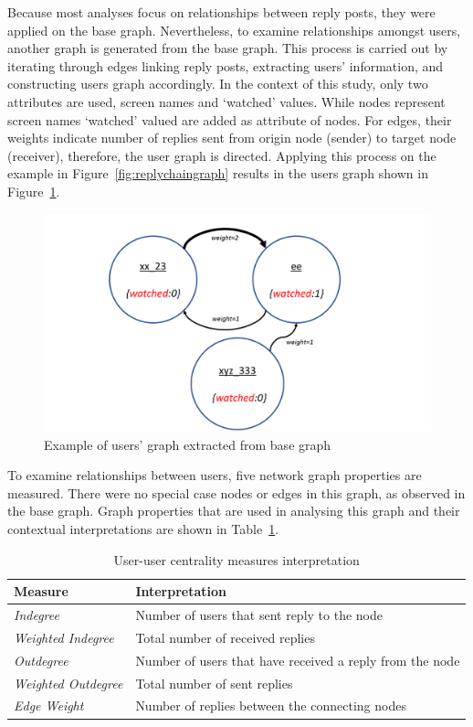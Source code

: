 \documentclass[sigconf]{acmart}
\begin{document}
Because most analyses focus on relationships between reply posts, they
were applied on the base graph. Nevertheless, to examine relationships
amongst users, another graph is generated from the base graph. This
process is carried out by iterating through edges linking reply posts,
extracting users' information, and constructing users graph
accordingly. In the context of this study, only two attributes are used, 
screen names and `watched' values. While nodes represent screen names 
`watched' valued are added as attribute of nodes. For edges, their weights 
indicate number of replies sent from origin node (sender) to target
node (receiver), therefore, the user graph is directed. Applying this
process on the example in Figure~\ref{fig:replychaingraph} results in
the users graph shown in Figure~\ref{fig:usersgraph}.

\begin{figure}[htb]
\centering
\includegraphics[width=\columnwidth]{images/usersgraph.png}
\caption{Example of users' graph extracted from base graph}
\label{fig:usersgraph}
\end{figure}

To examine relationships between users, five network graph properties
are measured. There were no special case nodes or edges in this graph,
as observed in the base graph. Graph properties that are used in
analysing this graph and their contextual interpretations are shown in
Table~\ref{tbl:uucentralitymeasuresinter}.

\begin{table}[!h]
\centering
\begin{tabularx}{\columnwidth}{lX}
\toprule
\textbf{Measure} & \textbf{Interpretation} \\ 
\midrule
{\emph{Indegree}} & Number of users that sent reply to the node \\
{\emph{Weighted Indegree}} & Total number of received replies \\
{\emph{Outdegree}} & Number of users that have received a reply from
                     the node \\ 
{\emph{Weighted Outdegree}} & Total number of sent replies \\
{\emph{Edge Weight}}& Number of replies between the connecting nodes\\
\bottomrule
\end{tabularx}
\caption{User-user centrality measures interpretation}
\label{tbl:uucentralitymeasuresinter}
\end{table}
\end{document}
